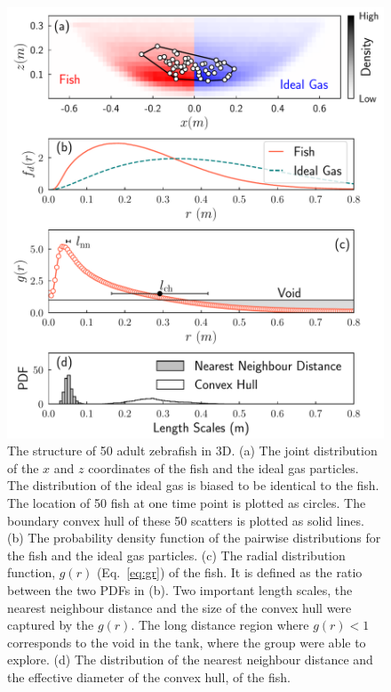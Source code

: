 \documentclass[11pt,twoside]{report}
\begin{document}
\begin{figure}
  \includegraphics[width=\linewidth]{structure-3d-50}
  \caption[The structure of 50 fish in 3D]{
  	The structure of 50 adult zebrafish in 3D.
  	(a) The joint distribution of the $x$ and $z$ coordinates of the fish and the ideal gas particles. The distribution of the ideal gas is biased to be identical to the fish. The location of 50 fish at one time point is plotted as circles. The boundary convex hull of these 50 scatters is plotted as solid lines.
  	(b) The probability density function of the pairwise distributions for the fish and the ideal gas particles.
  	(c) The radial distribution function, $g(r)$ (Eq.~\ref{eq:gr}) of the fish. It is defined as the ratio between the two PDFs in (b). Two important length scales, the nearest neighbour distance and the size of the convex hull were captured by the $g(r)$. The long distance region where $g(r) < 1$ corresponds to the void in the tank, where the group were able to explore.
  	(d) The distribution of the nearest neighbour distance and the effective diameter of the convex hull, of the fish.
  }
  \label{fig:structure-3d}
\end{figure}
\end{document}
